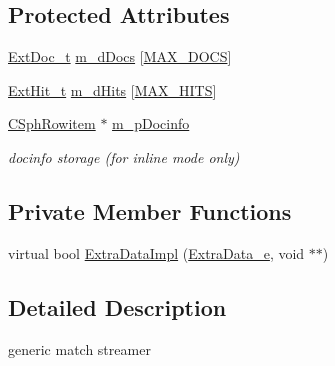 \subsection*{Protected Attributes}
\begin{DoxyCompactItemize}
\item 
\hyperlink{structExtDoc__t}{Ext\-Doc\-\_\-t} \hyperlink{classExtNode__i_a5215e69ee29f7442bfb7e94cc687d25a}{m\-\_\-d\-Docs} \mbox{[}\hyperlink{classExtNode__i_afe46dd6ff6757d7a0bf3318fd1462bf9}{M\-A\-X\-\_\-\-D\-O\-C\-S}\mbox{]}
\item 
\hyperlink{structExtHit__t}{Ext\-Hit\-\_\-t} \hyperlink{classExtNode__i_a45b5a401fb3bab19f61045de2b3bed2b}{m\-\_\-d\-Hits} \mbox{[}\hyperlink{classExtNode__i_a79b81cba51253fdbe56fd3595fac9ab4}{M\-A\-X\-\_\-\-H\-I\-T\-S}\mbox{]}
\item 
\hyperlink{sphinx_8h_a6a2df0f05f3397df8b6e230fda6f852f}{C\-Sph\-Rowitem} $\ast$ \hyperlink{classExtNode__i_ad270789c4ab2803c07397fb5b93cba12}{m\-\_\-p\-Docinfo}
\begin{DoxyCompactList}\small\item\em docinfo storage (for inline mode only) \end{DoxyCompactList}\end{DoxyCompactItemize}
\subsection*{Private Member Functions}
\begin{DoxyCompactItemize}
\item 
virtual bool \hyperlink{classExtNode__i_aef51ec6315c9f972d4007c794aa5324f}{Extra\-Data\-Impl} (\hyperlink{sphinxint_8h_ad3985aadf484a2191d9758968e2dfa88}{Extra\-Data\-\_\-e}, void $\ast$$\ast$)
\end{DoxyCompactItemize}


\subsection{Detailed Description}
generic match streamer 

